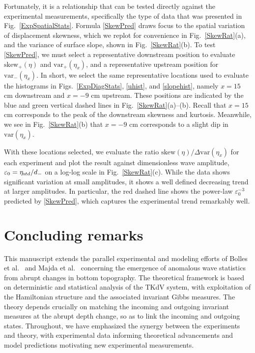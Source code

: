\documentclass[11pt]{article}
\newcommand{\eps}{\varepsilon}
\newcommand{\etastd}{\eta_{\text std}}
\newcommand{\depth}{d}
\newcommand{\dup}{\depth_{-}}
\newcommand{\skw}{\text{skew}}
\newcommand{\skwdn}{\skw_+}
\newcommand{\var}{\text{var}}
\newcommand{\varup}{\var_-}
\newcommand{\vardn}{\var_+}
\newcommand{\epsup}{\eps_0}
\begin{document}
	Fortunately, it is a relationship that can be tested directly against the experimental measurements, specifically the type of data that was presented in Fig.~\ref{ExpSpatialStats}. Formula \eqref{SkewPred} draws focus to the spatial variation of displacement skewness, which we replot for convenience in Fig.~\ref{SkewRat}(a), and the variance of surface slope, shown in Fig.~\ref{SkewRat}(b). To test \eqref{SkewPred}, we must select a representative downstream position to evaluate $\skwdn(\eta)$ and $\vardn(\eta_x)$, and a representative upstream position for $\varup(\eta_x)$. In short, we select the same representative locations  used to evaluate the histograms in Figs.~\ref{ExpDiagStats}, \ref{uhist}, and \ref{slopehist}, namely $x = 15$ cm downstream and $x = -9$ cm upstream. These positions are indicated by the blue and green vertical dashed lines in Fig.~\ref{SkewRat}(a)--(b). Recall that $x = 15$ cm corresponds to the peak of the downstream skewness and kurtosis. Meanwhile, we see in Fig.~\ref{SkewRat}(b) that $x = -9$ cm corresponds to a slight dip in $\var(\eta_x)$.

	With these locations selected, we evaluate the ratio $\skw(\eta) / \Delta \var(\eta_x)$ for each experiment and plot the result against dimensionless wave amplitude, $\epsup = \etastd / \dup$ on a log-log scale in Fig.~\ref{SkewRat}(c). While the data shows significant variation at small amplitudes, it shows a well defined decreasing trend at larger amplitudes. In particular, the red dashed line shows the power-law $\epsup^{-3}$ predicted by \eqref{SkewPred}, which captures the experimental trend remarkably well.




\section{Concluding remarks}
\label{conclusion}

	This manuscript extends the parallel experimental and modeling efforts of Bolles et al.~\cite{bolles2019} and Majda et al.~\cite{majda2019} concerning the emergence of anomalous wave statistics from abrupt changes in bottom topography. The theoretical framework is based on deterministic and statistical analysis of the TKdV system, with exploitation of the Hamiltonian structure and the associated invariant Gibbs measures. The theory depends crucially on matching the incoming and outgoing invariant measures at the abrupt depth change, so as to link the incoming and outgoing states. Throughout, we have emphasized the synergy between the experiments and theory, with experimental data informing theoretical advancements and model predictions motivating new experimental measurements.
	
\end{document}
